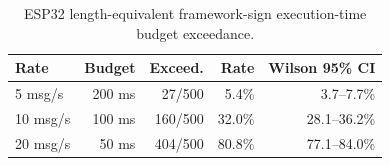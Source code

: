 \begin{table}[t]
\centering
\caption{ESP32 length-equivalent framework-sign execution-time budget exceedance.}
\label{tab:esp32-budget-ci}
\begin{tabular}{lrrrr}
\hline
\textbf{Rate} & \textbf{Budget} & \textbf{Exceed.} & \textbf{Rate} & \textbf{Wilson 95\% CI} \\
\hline
5 msg/s & 200 ms & 27/500 & 5.4\% & 3.7--7.7\% \\
10 msg/s & 100 ms & 160/500 & 32.0\% & 28.1--36.2\% \\
20 msg/s & 50 ms & 404/500 & 80.8\% & 77.1--84.0\% \\
\hline
\end{tabular}
\end{table}
